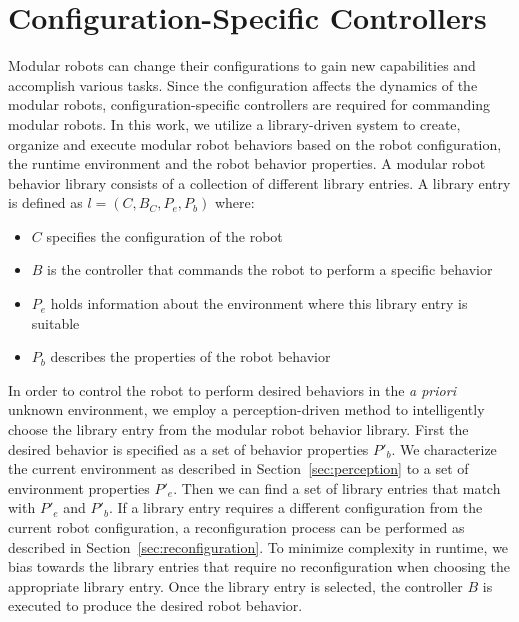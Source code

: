 \documentclass[conference]{IEEEtran}
\begin{document}
\section{Configuration-Specific Controllers}
\label{sec:configuration-specifics}
Modular robots can change their configurations to gain new capabilities and accomplish various tasks.
Since the configuration affects the dynamics of the modular robots, configuration-specific controllers are required for commanding modular robots.
In this work, we utilize a library-driven system to create, organize and execute modular robot behaviors based on the robot configuration, the runtime environment and the robot behavior properties.
A modular robot behavior library consists of a collection of different library entries.
A library entry is defined as $l = (C,B_C,P_e,P_b)$ where:
\begin{itemize}
\item $C$ specifies the configuration of the robot
\item $B$ is the controller that commands the robot to perform a specific behavior
\item $P_e$ holds information about the environment where this library entry is suitable
\item $P_b$ describes the properties of the robot behavior
\end{itemize}

In order to control the robot to perform desired behaviors in the \textit{a priori} unknown environment, we employ a perception-driven method to intelligently choose the library entry from the modular robot behavior library.
First the desired behavior is specified as a set of behavior properties $P'_b$.
We characterize the current environment as described in Section~\ref{sec:perception} to a set of environment properties $P'_e$.
Then we can find a set of library entries that match with $P'_e$ and $P'_b$.
If a library entry requires a different configuration from the current robot configuration, a reconfiguration process can be performed as described in Section~\ref{sec:reconfiguration}.
To minimize complexity in runtime, we bias towards the library entries that require no reconfiguration when choosing the appropriate library entry.
Once the library entry is selected, the controller $B$ is executed to produce the desired robot behavior.
\end{document}
